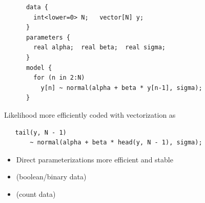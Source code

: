 \documentclass[10pt]{report}
\begin{document}
\vspace*{-6pt}
{\footnotesize
\begin{Verbatim}
      data {
        int<lower=0> N;   vector[N] y;
      }
      parameters {
        real alpha;  real beta;  real sigma;
      } 
      model {
        for (n in 2:N)
          y[n] ~ normal(alpha + beta * y[n-1], sigma);
      }
\end{Verbatim}
}
\vfill
\begin{subitemize}
\item Likelihood more efficiently coded with vectorization as
{\footnotesize
\begin{Verbatim}
   tail(y, N - 1) 
       ~ normal(alpha + beta * head(y, N - 1), sigma);
\end{Verbatim}
}
\end{subitemize}


\begin{itemize}
\item Direct parameterizations more efficient and stable
\item {} (boolean/binary data)
\item {} (count data)
\end{itemize}
\end{document}
